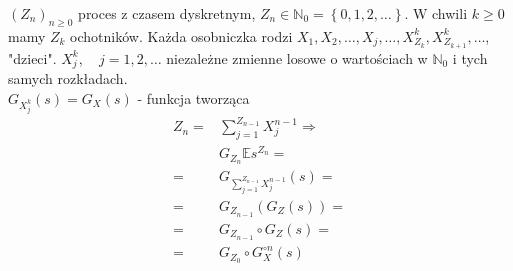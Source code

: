 $ \left(Z_n\right) _{n\ge 0}$ proces z czasem dyskretnym, $ Z_n\in \mathbb N _0=\left\{0,1,2,\dots \right\} $. W chwili $ k\ge 0 $ mamy $ Z_k $ ochotników. Każda osobniczka rodzi $ X_1,X_2,\dots,X_j,\dots,X_{Z_k}^k,X_{Z_{k+1}}^k,\dots $, "dzieci". $ X_j^k,\quad j=1,2,\dots $ niezależne zmienne losowe o wartościach w $ \mathbb N _0 $ i tych samych rozkładach.\\
$ G_{X_j^k}(s)=G_X(s) $ - funkcja tworząca
\begin{align*}
Z_n=&\sum_{j=1}^{Z_{n-1}}X_j^{n-1}\Rightarrow\\
& G_{Z_n}\mathbb E s^{Z_n}
=\\=&
G_{\sum_{j=1}^{Z_{n-1}}X_j^{n-1}}(s)
=\\=&
G_{Z_{n-1}}\left(G_Z(s)\right)
=\\=&
G_{Z_{n-1}}\circ G_Z(s)
=\\=&
G_{Z_0}\circ G_X^{\circ n}(s)
\end{align*}

